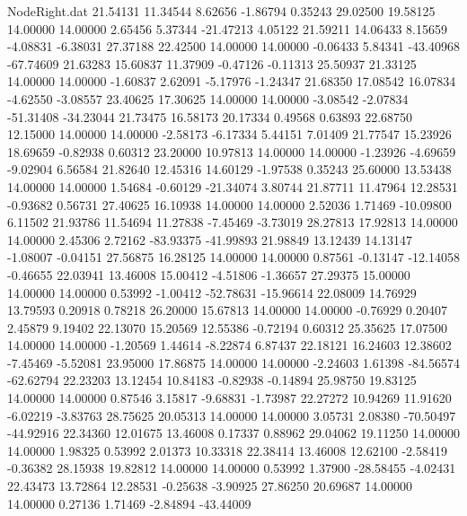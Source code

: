 \begin{filecontents}{NodeRight.dat}
  21.54131   11.34544    8.62656    -1.86794    0.35243   29.02500   19.58125   14.00000   14.00000    2.65456    5.37344  -21.47213    4.05122
  21.59211   14.06433    8.15659    -4.08831   -6.38031   27.37188   22.42500   14.00000   14.00000   -0.06433    5.84341  -43.40968  -67.74609
  21.63283   15.60837   11.37909    -0.47126   -0.11313   25.50937   21.33125   14.00000   14.00000   -1.60837    2.62091   -5.17976   -1.24347
  21.68350   17.08542   16.07834    -4.62550   -3.08557   23.40625   17.30625   14.00000   14.00000   -3.08542   -2.07834  -51.31408  -34.23044
  21.73475   16.58173   20.17334     0.49568    0.63893   22.68750   12.15000   14.00000   14.00000   -2.58173   -6.17334    5.44151    7.01409
  21.77547   15.23926   18.69659    -0.82938    0.60312   23.20000   10.97813   14.00000   14.00000   -1.23926   -4.69659   -9.02904    6.56584
  21.82640   12.45316   14.60129    -1.97538    0.35243   25.60000   13.53438   14.00000   14.00000    1.54684   -0.60129  -21.34074    3.80744
  21.87711   11.47964   12.28531    -0.93682    0.56731   27.40625   16.10938   14.00000   14.00000    2.52036    1.71469  -10.09800    6.11502
  21.93786   11.54694   11.27838    -7.45469   -3.73019   28.27813   17.92813   14.00000   14.00000    2.45306    2.72162  -83.93375  -41.99893
  21.98849   13.12439   14.13147    -1.08007   -0.04151   27.56875   16.28125   14.00000   14.00000    0.87561   -0.13147  -12.14058   -0.46655
  22.03941   13.46008   15.00412    -4.51806   -1.36657   27.29375   15.00000   14.00000   14.00000    0.53992   -1.00412  -52.78631  -15.96614
  22.08009   14.76929   13.79593     0.20918    0.78218   26.20000   15.67813   14.00000   14.00000   -0.76929    0.20407    2.45879    9.19402
  22.13070   15.20569   12.55386    -0.72194    0.60312   25.35625   17.07500   14.00000   14.00000   -1.20569    1.44614   -8.22874    6.87437
  22.18121   16.24603   12.38602    -7.45469   -5.52081   23.95000   17.86875   14.00000   14.00000   -2.24603    1.61398  -84.56574  -62.62794
  22.23203   13.12454   10.84183    -0.82938   -0.14894   25.98750   19.83125   14.00000   14.00000    0.87546    3.15817   -9.68831   -1.73987
  22.27272   10.94269   11.91620    -6.02219   -3.83763   28.75625   20.05313   14.00000   14.00000    3.05731    2.08380  -70.50497  -44.92916
  22.34360   12.01675   13.46008     0.17337    0.88962   29.04062   19.11250   14.00000   14.00000    1.98325    0.53992    2.01373   10.33318
  22.38414   13.46008   12.62100    -2.58419   -0.36382   28.15938   19.82812   14.00000   14.00000    0.53992    1.37900  -28.58455   -4.02431
  22.43473   13.72864   12.28531    -0.25638   -3.90925   27.86250   20.69687   14.00000   14.00000    0.27136    1.71469   -2.84894  -43.44009

\end{filecontents}
